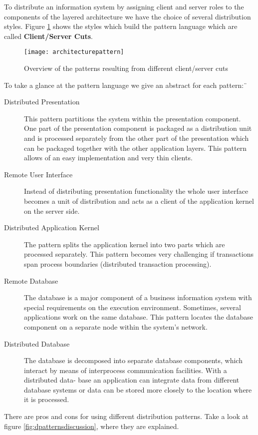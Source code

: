 To distribute an information system by assigning client and server roles to the components of the layered architecture we have the choice of several distribution styles. Figure \ref{fig:patternlanguage} shows the styles which build the pattern language which are called \textbf{Client/Server Cuts}.

\begin{figure}[H]
  \center
  \texttt{[image: architecturepattern]}
  \caption{Overview of the patterns resulting from different client/server cuts}
  \label{fig:patternlanguage}
\end{figure}


To take a glance at the pattern language we give an abstract for each pattern:¨
\begin{description}
	\item [Distributed Presentation] This pattern partitions the system within the presentation component. One part of the presentation component is packaged as a distribution unit and is processed separately from the other part of the presentation which can be packaged together with the other application layers. This pattern allows of an easy implementation and very thin clients.
	\item [Remote User Interface] Instead of distributing presentation functionality the whole user interface becomes a unit of distribution and acts as a client of the application kernel on the server side.
	\item [Distributed Application Kernel] The pattern splits the application kernel into two parts which are processed separately. This pattern becomes very challenging if transactions span process boundaries (distributed transaction processing).
	\item [Remote Database]  The database is a major component of a business information system with special requirements on the execution environment. Sometimes, several applications work on the same database. This pattern locates the database component on a separate node within the system’s network.
	\item [Distributed Database] The database is decomposed into separate database components, which interact by means of interprocess communication facilities. With a distributed data- base an application can integrate data from different database systems or data can be stored more closely to the location where it is processed.
\end{description}

There are pros and cons for using different distribution patterns. Take a look at figure \ref{fig:dpatternsdiscussion}, where they are explained.

